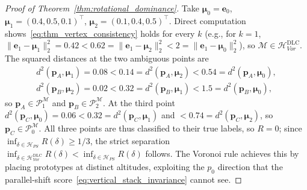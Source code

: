 \begin{proof}[Proof of Theorem~\ref{thm:rotational_dominance}]
    Take $\boldsymbol{\mu}_0 = \mathbf{e}_0$, $\boldsymbol{\mu}_1 = (0.4, 0.5, 0.1)^\top$, $\boldsymbol{\mu}_2 = (0.1, 0.4, 0.5)^\top$. Direct computation shows~\eqref{eq:thm_vertex_consistency} holds for every $k$ (e.g., for $k = 1$, $\|\mathbf{e}_1 - \boldsymbol{\mu}_1\|_2^2 = 0.42 < 0.62 = \|\mathbf{e}_1 - \boldsymbol{\mu}_2\|_2^2 < 2 = \|\mathbf{e}_1 - \boldsymbol{\mu}_0\|_2^2$), so $\mathcal{M} \in \mathcal{H}_{Vor}^{\mathrm{DLC}}$. The squared distances at the two ambiguous points are
    \begin{gather*}
        d^2(\mathbf{p}_A, \boldsymbol{\mu}_1) = 0.08 < 0.14 = d^2(\mathbf{p}_A, \boldsymbol{\mu}_2) < 0.54 = d^2(\mathbf{p}_A, \boldsymbol{\mu}_0), \\
        d^2(\mathbf{p}_B, \boldsymbol{\mu}_2) = 0.02 < 0.32 = d^2(\mathbf{p}_B, \boldsymbol{\mu}_1) < 1.5 = d^2(\mathbf{p}_B, \boldsymbol{\mu}_0),
    \end{gather*}
    so $\mathbf{p}_A \in \mathcal{P}_1^{\mathcal{M}}$ and $\mathbf{p}_B \in \mathcal{P}_2^{\mathcal{M}}$. At the third point $d^2(\mathbf{p}_C, \boldsymbol{\mu}_0) = 0.06 < 0.32 = d^2(\mathbf{p}_C, \boldsymbol{\mu}_1)$ and $< 0.74 = d^2(\mathbf{p}_C, \boldsymbol{\mu}_2)$, so $\mathbf{p}_C \in \mathcal{P}_0^{\mathcal{M}}$. All three points are thus classified to their true labels, so $R = 0$; since $\inf_{\delta \in \mathcal{H}_{PS}} R(\delta) \ge 1/3$, the strict separation $\inf_{\delta \in \mathcal{H}_{Vor}^{\mathrm{DLC}}} R(\delta) < \inf_{\delta \in \mathcal{H}_{PS}} R(\delta)$ follows. The Voronoi rule achieves this by placing prototypes at distinct altitudes, exploiting the $p_0$ direction that the parallel-shift score~\eqref{eq:vertical_stack_invariance} cannot see.
\end{proof}
